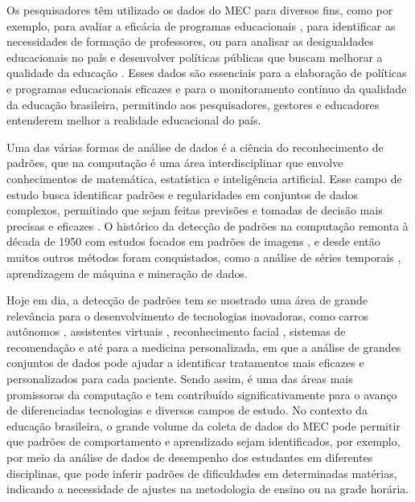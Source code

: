 Os pesquisadores têm utilizado os dados do MEC para diversos fins, como por exemplo, para avaliar a eficácia de programas educacionais \cite{VARGAS:2021}, para identificar as necessidades de formação de professores, ou para analisar as desigualdades educacionais no país e desenvolver políticas públicas que buscam melhorar a qualidade da educação \cite{santos:2019}. Esses dados são essenciais para a elaboração de políticas e programas educacionais eficazes e para o monitoramento contínuo da qualidade da educação brasileira, permitindo aos pesquisadores, gestores e educadores entenderem melhor a realidade educacional do país.

    Uma das várias formas de análise de dados é a ciência do reconhecimento de padrões, que na computação é uma área interdisciplinar que envolve conhecimentos de matemática, estatística e inteligência artificial.  Esse campo de estudo busca identificar padrões e regularidades em conjuntos de dados complexos, permitindo que sejam feitas previsões e tomadas de decisão mais precisas e eficazes \cite{PAOLANTI:2020100276}. O histórico da detecção de padrões na computação remonta à década de 1950 com estudos focados em padrões de imagens \cite{selfridge:1955}, e desde então muitos outros métodos foram conquistados, como a análise de séries temporais \cite{guralnik:1999}, aprendizagem de máquina e mineração de dados.
    
    Hoje em dia, a detecção de padrões tem se mostrado uma área de grande relevância para o desenvolvimento de tecnologias inovadoras, como carros autônomos \cite{carritos}, assistentes virtuais \cite{patternrec}, reconhecimento facial \cite{chen:2021}, sistemas de recomendação \cite{ahmed:2018} e até para a medicina personalizada, em que a análise de grandes conjuntos de dados pode ajudar a identificar tratamentos mais eficazes e personalizados para cada paciente.  Sendo assim, é uma das áreas mais promissoras da computação e tem contribuído significativamente para o avanço de diferenciadas tecnologias e diversos campos de estudo. No contexto da educação brasileira, o grande volume da coleta de dados do MEC pode permitir que padrões de comportamento e aprendizado sejam identificados, por exemplo, por meio da análise de dados de desempenho dos estudantes em diferentes disciplinas, que pode inferir padrões de dificuldades em determinadas matérias, indicando a necessidade de ajustes na metodologia de ensino ou na grade horária.
    
